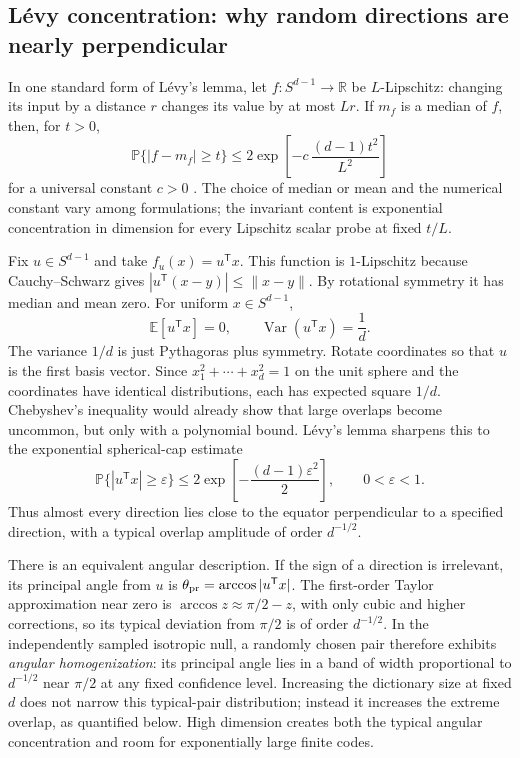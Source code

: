 \documentclass[
  aps,
  reprint,
  superscriptaddress,
  floatfix,
  nofootinbib,
  longbibliography
]{revtex4-2}
\newcommand{\R}{\mathbb{R}}
\newcommand{\E}{\mathbb{E}}
\newcommand{\Prob}{\mathbb{P}}
\newcommand{\Sph}[1]{S^{#1}}
\newcommand{\T}{^{\mathsf{T}}}
\newcommand{\norm}[1]{\lVert #1 \rVert}
\DeclareMathOperator{\Var}{Var}
\begin{document}
\subsection{L\'evy concentration: why random directions are nearly perpendicular}
\label{sec:levy}

In one standard form of L\'evy's lemma, let
$f:\Sph{d-1}\rightarrow\R$ be $L$-Lipschitz: changing its input by a distance
$r$ changes its value by at most $Lr$.  If $m_f$ is a median of $f$, then, for
$t>0$,
\begin{equation}
\label{eq:levy-general}
\Prob\{|f-m_f|\geq t\}
\leq
2\exp\!\left[-c\,\frac{(d-1)t^2}{L^2}\right]
\end{equation}
for a universal constant $c>0$
\cite{ledoux2001concentration,milman1986asymptotic}.  The choice of median or
mean and the numerical constant vary among formulations; the invariant
content is exponential concentration in dimension for every Lipschitz scalar
probe at fixed $t/L$.

Fix $u\in\Sph{d-1}$ and take $f_u(x)=u\T x$.  This function is
$1$-Lipschitz because Cauchy--Schwarz gives
$|u\T(x-y)|\leq\norm{x-y}$.  By rotational symmetry it has median and mean
zero.  For
uniform $x\in\Sph{d-1}$,
\begin{equation}
\label{eq:moments}
\E[u\T x]=0,
\qquad
\Var(u\T x)=\frac{1}{d}.
\end{equation}
The variance $1/d$ is just Pythagoras plus symmetry.  Rotate coordinates so
that $u$ is the first basis vector.  Since
$x_1^2+\cdots+x_d^2=1$ on the unit sphere and the coordinates have identical
distributions, each has expected square $1/d$.  Chebyshev's inequality would
already show that large overlaps become uncommon, but only with a polynomial
bound.  L\'evy's lemma sharpens this to the exponential spherical-cap estimate
\begin{equation}
\label{eq:overlap}
\Prob\{|u\T x|\geq\varepsilon\}
\leq
2\exp\!\left[-\frac{(d-1)\varepsilon^2}{2}\right],
\qquad 0<\varepsilon<1.
\end{equation}
Thus almost every direction lies close to the equator perpendicular to a
specified direction, with a typical overlap amplitude of order
$d^{-1/2}$.

There is an equivalent angular description.  If the sign of a direction is
irrelevant, its principal angle from $u$ is
$\theta_{\rm pr}=\arccos|u\T x|$.  The first-order Taylor approximation near
zero is $\arccos z\approx\pi/2-z$, with only cubic and higher corrections, so its typical deviation from $\pi/2$ is of
order $d^{-1/2}$.  In the independently sampled isotropic null, a randomly
chosen pair therefore
exhibits \emph{angular homogenization}: its principal angle lies in a band of
width proportional to $d^{-1/2}$ near $\pi/2$ at any fixed confidence level.
Increasing the dictionary size at
fixed $d$ does not narrow this typical-pair distribution; instead it increases
the extreme overlap, as quantified below.  High dimension creates both the
typical angular concentration and room for exponentially large finite codes.
\end{document}
